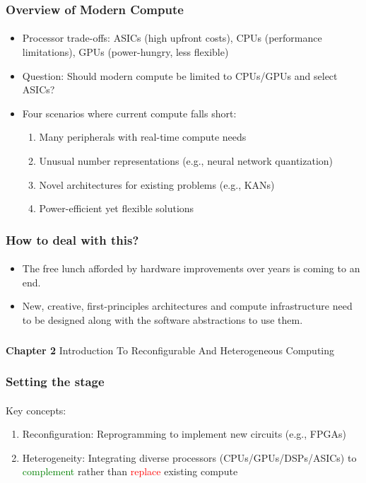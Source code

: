 \documentclass{beamer}
\begin{document}
{\begin{frame}[fragile]
\frametitle{Overview of Modern Compute}
\framesubtitle{}
\begin{itemize}
\item Processor trade-offs: ASICs (high upfront costs), CPUs (performance limitations), GPUs (power-hungry, less flexible)
\item Question: Should modern compute be limited to CPUs/GPUs and select ASICs?
\item Four scenarios where current compute falls short:
  \begin{enumerate}
    \item Many peripherals with real-time compute needs
    \item Unusual number representations (e.g., neural network quantization)
    \item Novel architectures for existing problems (e.g., KANs)
    \item Power-efficient yet flexible solutions
  \end{enumerate}
  \end{itemize}
\end{frame}

\begin{frame}[fragile]
\frametitle{How to deal with this?}
  \framesubtitle{}
  \begin{itemize}
    \item The free lunch afforded by hardware improvements over years
      is coming to an end.
    \item New, creative, first-principles architectures and
      compute infrastructure need to be designed along with the
      software abstractions to use them. 
  \end{itemize}
\end{frame}

\begin{frame}[c,fragile]
  \frametitle{}

  \centering
  \textbf{Chapter 2}
  \centering
  Introduction To Reconfigurable And Heterogeneous Computing
\end{frame}

\begin{frame}[fragile]
  \frametitle{Setting the stage}
  \framesubtitle{}
Key concepts:
  \begin{enumerate}
    \item Reconfiguration: Reprogramming to implement new circuits (e.g., FPGAs)
    \item Heterogeneity: Integrating diverse processors (CPUs/GPUs/DSPs/ASICs) to
  \textcolor{green}{complement} rather than \textcolor{red}{replace} existing compute
  \end{enumerate}


\end{frame}}
\end{document}
